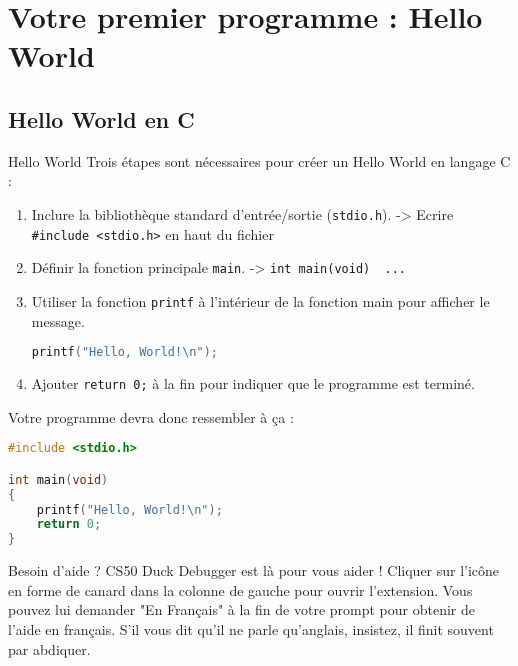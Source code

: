 
\section{Votre premier programme : Hello World}

\subsection{Hello World en C}

\begin{UPSTIManipulation}{Hello World}
	Trois étapes sont nécessaires pour créer un Hello World en langage C :
	\begin{enumerate}
		\item Inclure la bibliothèque standard d'entrée/sortie (\texttt{stdio.h}). -> Ecrire \texttt{\#include <stdio.h>} en haut du fichier
		\item Définir la fonction principale \texttt{main}. -> \texttt{int main(void) { ... }}
		\item Utiliser la fonction \texttt{printf} à l'intérieur de la fonction main pour afficher le message.
		      \begin{lstlisting}[language=c]
printf("Hello, World!\n");
\end{lstlisting}
		\item Ajouter \texttt{return 0;} à la fin pour indiquer que le programme est terminé.
	\end{enumerate}
\end{UPSTIManipulation}

Votre programme devra donc ressembler à ça :
\begin{lstlisting}[language=c]
#include <stdio.h>

int main(void)
{
    printf("Hello, World!\n");
    return 0;
}
\end{lstlisting}

\begin{UPSTIinfor}{Besoin d'aide ?}
	CS50 Duck Debugger est là pour vous aider !
	Cliquer sur l'icône en forme de canard dans la colonne de gauche pour ouvrir l'extension.
	Vous pouvez lui demander "En Français" à la fin de votre prompt pour obtenir de l'aide en français.  S'il vous dit qu'il ne parle qu'anglais, insistez, il finit souvent par abdiquer.
\end{UPSTIinfor}



